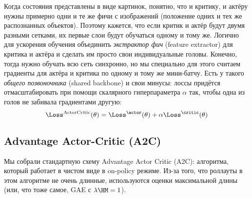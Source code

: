 \begin{remark}
Когда состояния представлены в виде картинок, понятно, что и критику, и актёру нужны примерно одни и те же фичи с изображений (положение одних и тех же распознанных объектов). Поэтому кажется, что если критик и актёр будут двумя разными сетками, их первые слои будут обучаться одному и тому же. Логично для ускорения обучения объединить \emph{экстрактор фич} (feature extractor) для критика и актёра и сделать им просто свои индивидуальные головы. Конечно, тогда нужно обучать всю сеть синхронно, но мы специально для этого считаем градиенты для актёра и критика по одному и тому же мини-батчу. Есть у такого \emph{общего позвоночника} (shared backbone) и свои минусы: лоссы придётся отмасштабировать при помощи скалярного гиперпараметра $\alpha$ так, чтобы одна из голов не забивала градиентами другую:
$$\Loss^{\mathrm{ActorCritic}}(\theta) = \Loss^{\actor}(\theta) + \alpha \Loss^{\critic}(\theta)$$
\end{remark}

\subsection{Advantage Actor-Critic (A2C)}

Мы собрали стандартную схему Advantage Actor Critic (A2C): алгоритма, который работает в чистом виде в on-policy режиме. Из-за того, что роллауты в этом алгоритме не очень длинные, используются оценки максимальной длины (или, что тоже самое, GAE с $\lambda \HM= 1$). 

